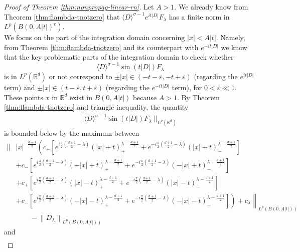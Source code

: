\documentclass[a4paper, reqno, 11pt]{amsart}
\theoremstyle{definition}
\begin{document}
\begin{proof}[Proof of Theorem \ref{thm:nonpropag-linear-rn}]

Let $A>1$. We already know from Theorem \eqref{thm:flambda-tnotzero} that $\langle D \rangle^{\sigma-1} e^{it|D|} F_{\lambda}$ has a finite norm in $L^p(B(0,A|t|)^c)$.\\

We focus on the part of the integration domain concerning $|x| < A|t|$. Namely, from Theorem \ref{thm:flambda-tnotzero} and its counterpart with $e^{-it|D|}$ we know that the key problematic parts of the integration domain to check whether 
$$\langle D \rangle^{\sigma-1} \sin(t|D|) F_{\lambda}$$
is in $L^p(\mathbb{R}^d)$ or not correspond to $\pm|x| \in (-t-\varepsilon,-t+\varepsilon)$ (regarding the $e^{it|D|}$ term) and $\pm|x| \in (t-\varepsilon,t+\varepsilon)$ (regarding the $e^{-it|D|}$ term), for $0 < \varepsilon \ll 1$. These points $x$ in $\mathbb{R}^d$ exist in $B(0,A|t|)$ because $A > 1$. By Theorem \ref{thm:flambda-tnotzero} and triangle inequality, the quantity
\begin{align*}
| \langle D \rangle^{\sigma-1} \sin(t|D|) F_{\lambda} \|_{L^p(\mathbb{R}^d)}
\end{align*}
is bounded below by the maximum between
\begin{align}\label{eq:boundbelow-1}
\left\| \right. & |x|^{-\frac{d-1}{2}} \left( c_+ [ e^{i\frac{\pi}{2}(\frac{d+1}{2} - \lambda)} (|x| + t)_+^{\lambda-\frac{d+1}{2}} + e^{-i\frac{\pi}{2}(\frac{d+1}{2} - \lambda)} \left(|x| + t\right)_-^{\lambda-\frac{d+1}{2}}] \nonumber  \right. \\
&\left. + c_-  [ e^{i\frac{\pi}{2}(\frac{d+1}{2} - \lambda)}(-|x| + t)_+^{\lambda-\frac{d+1}{2}} + e^{-i\frac{\pi}{2}(\frac{d+1}{2} - \lambda)} \left(-|x| + t\right)_-^{\lambda-\frac{d+1}{2}} ]\right. \nonumber \\
& \left. + c_+ [ e^{i\frac{\pi}{2}(\frac{d+1}{2} - \lambda)} (|x| - t)_+^{\lambda-\frac{d+1}{2}} + e^{-i\frac{\pi}{2}(\frac{d+1}{2} - \lambda)} \left( |x| - t \right)_-^{\lambda-\frac{d+1}{2}}] \nonumber \right. \\
&\left. \left. + c_-  [ e^{i\frac{\pi}{2}(\frac{d+1}{2} - \lambda)}(-|x| - t)_+^{\lambda-\frac{d+1}{2}} + e^{-i\frac{\pi}{2}(\frac{d+1}{2} - \lambda)} \left(-|x| - t\right)_-^{\lambda-\frac{d+1}{2}} ] \right) + c_{\lambda}  \right\|_{L^p(B(0,A|t|))} \nonumber \\
& \qquad - \left\| D_{\lambda} \right\|_{L^p(B(0,A|t|))}
\end{align}
and
\begin{align}\label{eq:boundbelow-2}

\end{align}
\end{proof}
\end{document}
